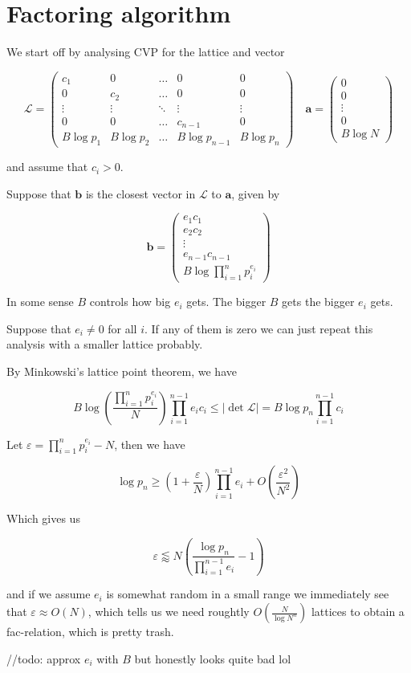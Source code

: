 \documentclass[12pt,titlepage]{article}
\title{}
\date{\today}
\author{}
\theoremstyle{remark}
\newcommand{\mf}{\mathbf}
\newcommand{\mc}{\mathcal}
\begin{document}
\section{Factoring algorithm}

We start off by analysing CVP for the lattice and vector

\[\mc L=\begin{pmatrix}c_1&0&\dots&0&0\\0&c_2&\dots&0&0\\\vdots&\vdots&\ddots&\vdots&\vdots\\0&0&\dots&c_{n-1}&0\\B\log p_1&B\log p_2&\dots&B\log p_{n-1}&B\log p_n\end{pmatrix}\quad\mf a=\begin{pmatrix}0\\0\\\vdots\\0\\B\log N\end{pmatrix}\]

and assume that $c_i>0$.

Suppose that $\mf b$ is the closest vector in $\mathcal L$ to $\mf a$, given by

\[\mf b=\begin{pmatrix}e_1c_1\\e_2c_2\\\vdots\\e_{n-1}c_{n-1}\\B\log\prod_{i=1}^np_i^{e_i}\end{pmatrix}\]

In some sense $B$ controls how big $e_i$ gets. The bigger $B$ gets the bigger $e_i$ gets.

Suppose that $e_i\neq0$ for all $i$. If any of them is zero we can just repeat this analysis with a smaller lattice probably.

By Minkowski's lattice point theorem, we have

\[B\log\left(\frac{\prod_{i=1}^np_i^{e_i}}{N}\right)\prod_{i=1}^{n-1}e_ic_i\leq|\det\mc L|=B\log p_n\prod_{i=1}^{n-1}c_i\]

Let $\varepsilon=\prod_{i=1}^np_i^{e_i}-N$, then we have

\[\log p_n\geq\left(1+\frac\varepsilon N\right)\prod_{i=1}^{n-1}e_i+O\left(\frac{\varepsilon^2}{N^2}\right)\]

Which gives us

\[\varepsilon\lessapprox N\left(\frac{\log p_n}{\prod_{i=1}^{n-1}e_i}-1\right)\]

and if we assume $e_i$ is somewhat random in a small range we immediately see that $\varepsilon\approx O(N)$, which tells us we need roughtly $O\left(\frac{N}{\log N^n}\right)$ lattices to obtain a fac-relation, which is pretty trash.

//todo: approx $e_i$ with $B$ but honestly looks quite bad lol

\end{document}
